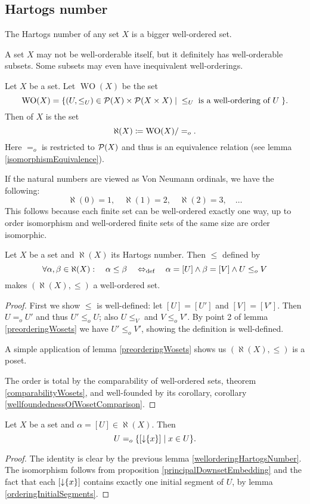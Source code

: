 \subsection{Hartogs number}
The Hartogs number of any set $X$ is a bigger well-ordered set.

A set $X$ may not be well-orderable itself, but it definitely has well-orderable subsets. Some subsets may even have inequivalent well-orderings.
\begin{definition}
Let $X$ be a set. Let $\operatorname{WO}(X)$ be the set
\[ \operatorname{WO}(X) = \{ (U,\leq_U) \in \operatorname{\mathcal{P}}(X)\times\operatorname{\mathcal{P}}(X\times X) \;|\; \leq_U\; \text{is a well-ordering of $U$}\;  \}. \]
Then  of $X$ is the set
\[ \aleph(X) \coloneqq \operatorname{WO}(X)/=_o. \]
Here $=_o$ is restricted to $\operatorname{\mathcal{P}}(X)$ and thus is an equivalence relation (see lemma \ref{isomorphismEquivalence}).
\end{definition}
If the natural numbers are viewed as Von Neumann ordinals, we have the following:
\[ \aleph(0) = 1, \quad \aleph(1) = 2, \quad \aleph(2) = 3, \quad \ldots \]
This follows because each finite set can be well-ordered exactly one way, up to order isomorphism and well-ordered finite sets of the same size are order isomorphic.

\begin{lemma} \label{wellorderingHartogsNumber}
Let $X$ be a set and $\aleph(X)$ its Hartogs number. Then $\leq$ defined by
\[ \forall \alpha, \beta \in \aleph(X):\quad \alpha \leq \beta \quad\Leftrightarrow_{\text{def}}\quad \alpha = [U] \land \beta = [V] \land U\leq_o V \]
makes $(\aleph(X), \leq)$ a well-ordered set.
\end{lemma}
\begin{proof}
First we show $\leq$ is well-defined: let $[U] = [U']$ and $[V] = [V']$. Then $U =_o U'$ and thus $U'\leq_o U$; also $U \leq_V$ and $V\leq_o V'$. By point 2 of lemma \ref{preorderingWosets} we have $U' \leq_o V'$, showing the definition is well-defined.

A simple application of lemma \ref{preorderingWosets} shows us $(\aleph(X), \leq)$ is a poset.

The order is total by the comparability of well-ordered sets, theorem \ref{comparabilityWosets}, and well-founded by its corollary, corollary \ref{wellfoundednessOfWosetComparison}.
\end{proof}

\begin{lemma} \label{HartogsNumberAsOrdinal}
Let $X$ be a set and $\alpha = [U] \in \aleph(X)$. Then
\[ U =_o \setbuilder{ [\downset\{x\}] }{ x\in U }. \]
\end{lemma}
\begin{proof}
The identity is clear by the previous lemma \ref{wellorderingHartogsNumber}. The isomorphism follows from proposition \ref{principalDownsetEmbedding} and the fact that each $[\operatorname{\downarrow}\{x\}]$ contains exactly one initial segment of $U$, by lemma \ref{orderingInitialSegments}.
\end{proof}

